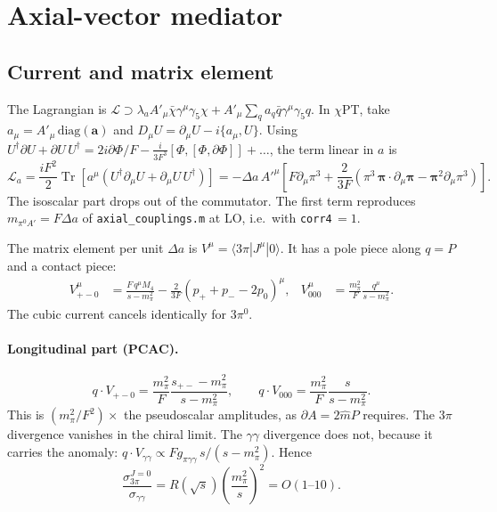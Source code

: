 \documentclass{article}
\newcommand{\tr}{\operatorname{Tr}}
\newcommand{\spm}{s_{+-}}
\newcommand{\mpi}{m_\pi}
\newcommand{\Da}{\Delta a}
\begin{document}
\section{Axial-vector mediator}

\subsection{Current and matrix element}

The Lagrangian is
$\mathcal L\supset\lambda_aA'_\mu\bar\chi\gamma^\mu\gamma_5\chi
+A'_\mu\sum_q a_q\bar q\gamma^\mu\gamma_5q$.
In $\chi$PT, take $a_\mu=A'_\mu\,\mathrm{diag}(\mathbf a)$ and
$D_\mu U=\partial_\mu U-i\{a_\mu,U\}$. Using
$U^\dagger\partial U+\partial U\,U^\dagger=2i\partial\Phi/F-\tfrac{i}{3F^3}[\Phi,[\Phi,\partial\Phi]]+\dots$,
the term linear in $a$ is
\begin{equation}
  \mathcal L_a=\frac{iF^2}{2}\tr\!\left[a^\mu(U^\dagger\partial_\mu U+\partial_\mu U\,U^\dagger)\right]
  =-\Da\,A'^\mu\left[F\partial_\mu\pi^3+\frac{2}{3F}\left(\pi^3\,\boldsymbol\pi\!\cdot\!\partial_\mu\boldsymbol\pi
  -\boldsymbol\pi^2\partial_\mu\pi^3\right)\right].
\end{equation}
The isoscalar part drops out of the commutator. The first term reproduces
$m_{\pi^0A'}=F\Da$ of \texttt{axial\_couplings.m} at LO, i.e.\ with \texttt{corr4}$\,=1$.

The matrix element per unit $\Da$ is $V^\mu=\langle3\pi|J^\mu|0\rangle$. It has a pole piece
along $q=P$ and a contact piece:
\begin{align}
  V^\mu_{+-0}&=\frac{F\,q^\mu M_4}{s-\mpi^2}-\frac{2}{3F}(p_++p_--2p_0)^\mu, &
  V^\mu_{000}&=\frac{\mpi^2}{F}\frac{q^\mu}{s-\mpi^2}.
\end{align}
The cubic current cancels identically for $3\pi^0$.

\paragraph{Longitudinal part (PCAC).}
\begin{equation}
  q\cdot V_{+-0}=\frac{\mpi^2}{F}\frac{\spm-\mpi^2}{s-\mpi^2},\qquad
  q\cdot V_{000}=\frac{\mpi^2}{F}\frac{s}{s-\mpi^2}.
\end{equation}
This is $(\mpi^2/F^2)\times$ the pseudoscalar amplitudes, as $\partial A=2\hat m P$ requires. The
$3\pi$ divergence vanishes in the chiral limit. The $\gamma\gamma$ divergence does not, because it
carries the anomaly: $q\cdot V_{\gamma\gamma}\propto F g_{\pi\gamma\gamma}\,s/(s-\mpi^2)$. Hence
\begin{equation}
  \frac{\sigma^{J=0}_{3\pi}}{\sigma_{\gamma\gamma}}=R(\sqrt s)\left(\frac{\mpi^2}{s}\right)^2 = O(1\text{--}10).
\end{equation}
\end{document}
